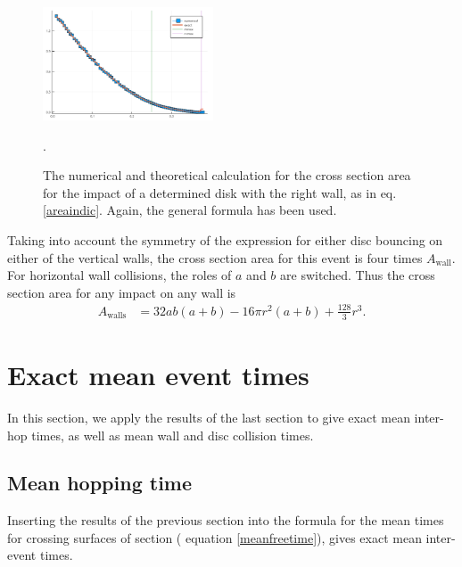 \documentclass[superscriptaddress,pre,reprint,showpacs,onecolumn]{revtex4-1}
\begin{document}
\begin{figure}
\centering
\includegraphics[width=0.45\textwidth]{./figures/AreaWall01.png}
\caption{The numerical and theoretical calculation for the cross section area
for the impact of a determined disk with the right wall, as in eq. \ref{areaindic}.
Again, the general formula has been used.}
\label{area1derecha}.
\end{figure}

Taking into account the symmetry of the expression for either disc
 bouncing on either of the vertical walls, the
cross section area for this event is four times $A_\textrm{wall}$. For horizontal wall 
collisions, the roles of $a$ and $b$ are switched.
Thus the cross section area for any impact on any wall is
\begin{align}\label{areawalls}
 A_\text{walls} & = 32 a b (a+b)-16 \pi r^2 (a+b) +\frac{128}{3}r^3.
\end{align}


\section{Exact mean event times}

In this section, we apply the results of the last section to give
exact mean inter-hop times, as well as mean wall and disc collision times.


\subsection{Mean hopping time}

 
Inserting the results of the previous section 
into the formula for the mean times for crossing
surfaces of section ( equation \ref{meanfreetime}), gives exact mean inter-event times.
\end{document}
